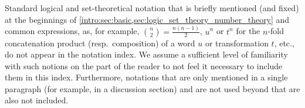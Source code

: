 









\label{chap:notationindex}

\noindent Standard logical and set-theoretical notation
that is briefly mentioned (and fixed) at the beginnings
of \cref{intro:sec:basic,sec:logic_set_theory_number_theory}
and common %
expressions, as, for example, $\binom{n}{2} = \frac{n(n-1)}{2}$, $u^n$ or $t^n$ for the $n$-fold concatenation product (resp.~composition) of a word $u$ or transformation $t$, etc.,
do not appear in the notation index.
We assume a sufficient level of familiarity
with such notions on the part of the reader to not feel it necessary
to include them in this index. Furthermore, notations that are only mentioned in a single paragraph (for example, in a discussion section)
and are not used beyond that are also not included.


